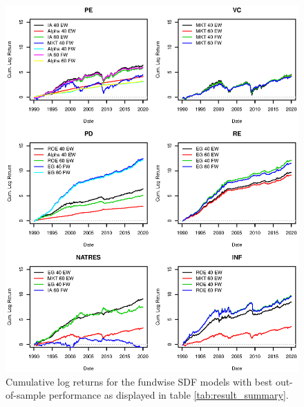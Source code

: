\documentclass[12pt]{article}
\begin{document}
\newpage



\begin{figure}[h]
	\centering
	\includegraphics{eps/0_SDF_realizations_fundwise}
	\caption{Cumulative log returns for the fundwise SDF models with best out-of-sample performance as displayed in table \ref{tab:result_summary}.
	}
	\label{fig:sdf_log_returns}
\end{figure}
\end{document}
